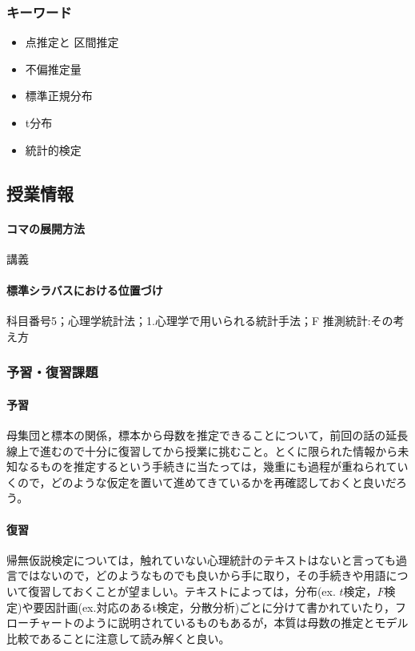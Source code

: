 \subsubsection{キーワード}
\begin{itemize}
	\item 点推定と 区間推定
	\item 不偏推定量
	\item 標準正規分布
	\item t分布
	\item 統計的検定
\end{itemize}
\subsection{授業情報}
\paragraph{コマの展開方法}
講義
\paragraph{標準シラバスにおける位置づけ}
科目番号5；心理学統計法；1.心理学で用いられる統計手法；F 推測統計:その考え方
\subsubsection{予習・復習課題}
\paragraph{予習}
母集団と標本の関係，標本から母数を推定できることについて，前回の話の延長線上で進むので十分に復習してから授業に挑むこと。とくに限られた情報から未知なるものを推定するという手続きに当たっては，幾重にも過程が重ねられていくので，どのような仮定を置いて進めてきているかを再確認しておくと良いだろう。
\paragraph{復習}
帰無仮説検定については，触れていない心理統計のテキストはないと言っても過言ではないので，どのようなものでも良いから手に取り，その手続きや用語について復習しておくことが望ましい。テキストによっては，分布(ex. $t$検定，$F$検定)や要因計画(ex.対応のあるt検定，分散分析)ごとに分けて書かれていたり，フローチャートのように説明されているものもあるが，本質は母数の推定とモデル比較であることに注意して読み解くと良い。